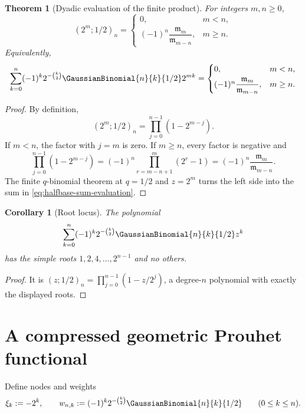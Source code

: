 \documentclass[11pt,a4paper,oneside,openany]{book}
\newtheorem{theorem}{Theorem}[chapter]
\newtheorem{corollary}[corollary]{Corollary}
\theoremstyle{definition}
\theoremstyle{remark}
\begin{document}
\begin{theorem}[Dyadic evaluation of the finite product]\label{thm:dyadic-product-evaluation}
For integers $m,n\ge0$,
\begin{equation}\label{eq:dyadic-product-evaluation}
 (2^m;1/2)_n
 =
 \begin{cases}
  0,&m<n,\\[3pt]
  (-1)^n\dfrac{\mathfrak m_m}{\mathfrak m_{m-n}},&m\ge n.
 \end{cases}
\end{equation}
Equivalently,
\begin{equation}\label{eq:halfbase-sum-evaluation}
 \sum_{k=0}^{n}(-1)^k2^{-\binom k2}
 \GaussianBinomial{n}{k}{1/2}2^{mk}
 =
 \begin{cases}
  0,&m<n,\\[3pt]
  (-1)^n\dfrac{\mathfrak m_m}{\mathfrak m_{m-n}},&m\ge n.
 \end{cases}
\end{equation}
\end{theorem}

\begin{proof}
By definition,
\[
 (2^m;1/2)_n=\prod_{j=0}^{n-1}(1-2^{m-j}).
\]
If $m<n$, the factor with $j=m$ is zero.  If $m\ge n$, every factor is negative and
\[
 \prod_{j=0}^{n-1}(1-2^{m-j})
 =(-1)^n\prod_{r=m-n+1}^{m}(2^r-1)
 =(-1)^n\frac{\mathfrak m_m}{\mathfrak m_{m-n}}.
\]
The finite $q$-binomial theorem at $q=1/2$ and $z=2^m$ turns the left side into the sum in \eqref{eq:halfbase-sum-evaluation}.
\end{proof}

\begin{corollary}[Root locus]\label{cor:halfbase-root-locus}
The polynomial
\[
 \sum_{k=0}^{n}(-1)^k2^{-\binom k2}\GaussianBinomial{n}{k}{1/2}z^k
\]
has the simple roots $1,2,4,\ldots,2^{n-1}$ and no others.
\end{corollary}

\begin{proof}
It is $(z;1/2)_n=\prod_{j=0}^{n-1}(1-z/2^j)$, a degree-$n$ polynomial with exactly the displayed roots.
\end{proof}

\section{A compressed geometric Prouhet functional}

Define nodes and weights
\begin{equation}\label{eq:halfbase-prouhet-data}
 \xi_k:=-2^k,
 \qquad
 w_{n,k}:=(-1)^k2^{-\binom k2}\GaussianBinomial{n}{k}{1/2}
 \qquad(0\le k\le n).
\end{equation}
\end{document}
